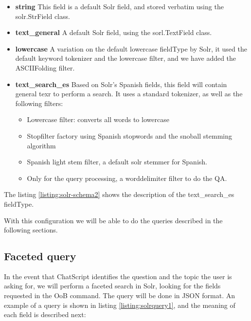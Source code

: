 \begin{itemize}
 \item \textbf{ string } This field is a default Solr field, and stored verbatim using the solr.StrField class.
 \item \textbf{ text\_general } A default Solr field, using the sorl.TextField class.
 \item \textbf{ lowercase } A variation on the default lowercase fieldType by Solr, it used the default keyword tokenizer and the lowercase filter, and we have added the ASCIIFolding filter.
 \item \textbf{ text\_search\_es } Based on Solr's Spanish fields, this field will contain general texr to perform a search. It uses a standard tokenizer, as well as the following filters:
 \begin{itemize}
  \item Lowercase filter: converts all words to lowercase 
  \item Stopfilter factory using Spanish stopwords and the snoball stemming algorithm
  \item Spanish light stem filter, a default solr stemmer for Spanish.
  \item Only for the query processing, a worddelimiter filter to do the QA.
 \end{itemize}
\end{itemize}

The listing \ref{listing:solr-schema2} shows the description of the text\_search\_es fieldType.

\begin{center}
  
\end{center}

With this configuration we will be able to do the queries described in the following sections.


\subsection{Faceted query}

In the event that ChatScript identifies the question and the topic the user is asking for, we will perform a faceted search in Solr, looking for the fields requested in the \ac{OoB} command. The query will be done in JSON format. An example of a query is shown in listing \ref{listing:solrquery1}, and the meaning of each field is described next:

